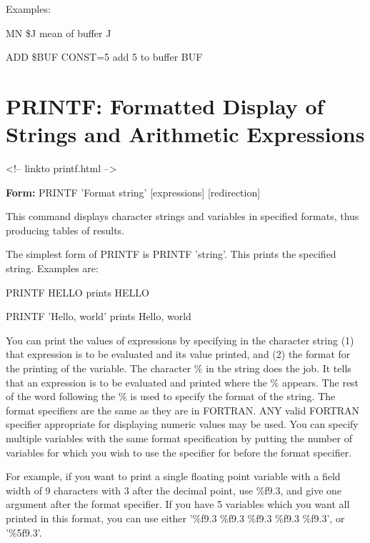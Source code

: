 Examples:
\begin{example}
  \item[MN \$J\hfill]{mean of buffer J}
  \item[ADD \$BUF CONST=5\hfill]{add 5 to buffer BUF}
\end{example}

\section{PRINTF: Formatted Display of Strings and Arithmetic Expressions}
\begin{rawhtml}
<!-- linkto printf.html -->
\end{rawhtml}

\begin{command}
  \item[\textbf{Form: } PRINTF 'Format string' {[expressions]} {[redirection]}\hfill]{}
\end{command}
This command displays character strings and variables in specified formats,
thus producing tables of results.

The simplest form of PRINTF is PRINTF 'string'.  This prints the specified
string.  Examples are:
\begin{example}
  \item[PRINTF HELLO\hfill]{prints HELLO}
  \item[PRINTF 'Hello, world'\hfill]{prints Hello, world}
\end{example}

You can print the values of expressions by specifying in the character
string (1) that expression is to be evaluated and its value printed, and
(2) the format for the printing of the variable.  The character \% in the
string does the job. It tells that an expression is to be evaluated and
printed where the \% appears. The rest of the word following the \% is used
to specify the format of the string.  The format specifiers are the same as
they are in FORTRAN.  ANY valid FORTRAN specifier appropriate for
displaying numeric values may be used. You can specify multiple variables
with the same format specification by putting the number of variables for
which you wish to use the specifier for before the format specifier.

For example, if you want to print a single floating point variable with a
field width of 9 characters with 3 after the decimal point, use
\%f9.3, and give one argument after the format specifier. If you have
5 variables which you want all printed in this format, you can use
either '\%f9.3 \%f9.3 \%f9.3 \%f9.3 \%f9.3', or '\%5f9.3'.

